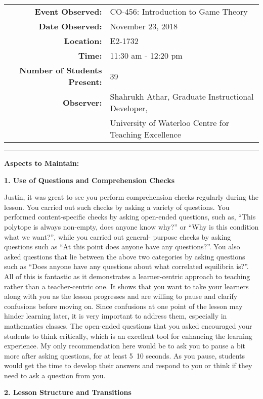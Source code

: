\documentclass{article}
\begin{document}
\begin{tabular}{r l}
\textbf{Event Observed:}&	CO-456: Introduction to Game Theory\\
\textbf{Date Observed:}&	November 23, 2018\\
\textbf{Location:}&	E2-1732\\
\textbf{Time:}&	11:30 am - 12:20 pm\\
\textbf{Number of Students Present:}&	39\\
\textbf{Observer:}&	Shahrukh Athar, Graduate Instructional Developer,\\
     &University of Waterloo Centre for Teaching Excellence\\
\end{tabular}

\rule{\linewidth}{0.25mm}
\textbf{Aspects to Maintain:}

\textbf{1. Use of Questions and Comprehension Checks}

Justin, it was great to see you perform comprehension checks regularly during the lesson. You carried out such checks by asking a variety of questions. You performed content-specific checks by asking open-ended questions, such as, “This polytope is always non-empty, does anyone know why?” or “Why is this condition what we want?”, while you carried out general- purpose checks by asking questions such as “At this point does anyone have any questions?”. You also asked questions that lie between the above two categories by asking questions such as “Does anyone have any questions about what correlated equilibria is?”. All of this is fantastic as it demonstrates a learner-centric approach to teaching rather than a teacher-centric one. It shows that you want to take your learners along with you as the lesson progresses and are willing to pause and clarify confusions before moving on. Since confusions at one point of the lesson may hinder learning later, it is very important to address them, especially in mathematics classes. The open-ended questions that you asked encouraged your students to think critically, which is an excellent tool for enhancing the learning experience. My only
recommendation here would be to ask you to pause a bit more after asking questions, for at least 5~10 seconds. As you pause, students would get the time to develop their answers and respond to you or think if they need to ask a question from you.

\textbf{2. Lesson Structure and Transitions}
\end{document}
